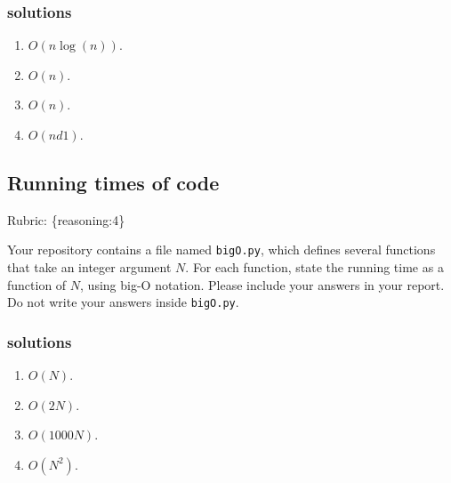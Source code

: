 \documentclass{article}
\def\rubric#1{\gre{Rubric: \{#1\}}}{}
\def\blu#1{{\color{blu}#1}}
\def\gre#1{{\color{gre}#1}}
\def\enum#1{\begin{enumerate}#1\end{enumerate}}
\begin{document}
\subsubsection{solutions}
\enum{
\item $O(n\log(n))$.
\item $O(n)$.
\item $O(n)$.
\item $O(nd1)$.
}
\subsection{Running times of code}
\rubric{reasoning:4}

Your repository contains a file named \texttt{bigO.py}, which defines several functions
that take an integer argument $N$. For each function, \blu{state the running time as a function of $N$, using big-O notation}.
Please include your answers in your report. Do not write your answers inside \texttt{bigO.py}.

\subsubsection{solutions}
\enum{
\item  $O(N)$.
\item $O(2N)$.
\item $O(1000N)$.
\item $O(N^2)$.
}
\vspace{50pt}
\end{document}
